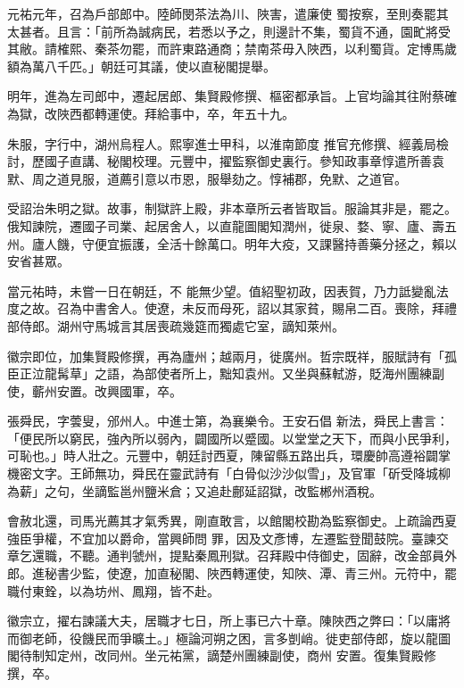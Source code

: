 \begin{pinyinscope}
 元祐元年，召為戶部郎中。陸師閔茶法為川、陜害，遣廉使
 蜀按察，至則奏罷其太甚者。且言：「前所為誠病民，若悉以予之，則邊計不集，蜀貨不通，園甿將受其敝。請榷熙、秦茶勿罷，而許東路通商；禁南茶毋入陜西，以利蜀貨。定博馬歲額為萬八千匹。」朝廷可其議，使以直秘閣提舉。



 明年，進為左司郎中，遷起居郎、集賢殿修撰、樞密都承旨。上官均論其往附蔡確為獄，改陜西都轉運使。拜給事中，卒，年五十九。



 朱服，字行中，湖州烏程人。熙寧進士甲科，以淮南節度
 推官充修撰、經義局檢討，歷國子直講、秘閣校理。元豐中，擢監察御史裏行。參知政事章惇遣所善袁默、周之道見服，道薦引意以市恩，服舉劾之。惇補郡，免默、之道官。



 受詔治朱明之獄。故事，制獄許上殿，非本章所云者皆取旨。服論其非是，罷之。俄知諫院，遷國子司業、起居舍人，以直龍圖閣知潤州，徙泉、婺、寧、廬、壽五州。廬人饑，守便宜振護，全活十餘萬口。明年大疫，又課醫持善藥分拯之，賴以安省甚眾。



 當元祐時，未嘗一日在朝廷，不
 能無少望。值紹聖初政，因表賀，乃力詆變亂法度之故。召為中書舍人。使遼，未反而母死，詔以其家貧，賜帛二百。喪除，拜禮部侍郎。湖州守馬城言其居喪疏幾筵而獨處它室，謫知萊州。



 徽宗即位，加集賢殿修撰，再為廬州；越兩月，徙廣州。哲宗既祥，服賦詩有「孤臣正泣龍髯草」之語，為部使者所上，黜知袁州。又坐與蘇軾游，貶海州團練副使，蘄州安置。改興國軍，卒。



 張舜民，字蕓叟，邠州人。中進士第，為襄樂令。王安石倡
 新法，舜民上書言：「便民所以窮民，強內所以弱內，闢國所以蹙國。以堂堂之天下，而與小民爭利，可恥也。」時人壯之。元豐中，朝廷討西夏，陳留縣五路出兵，環慶帥高遵裕闢掌機密文字。王師無功，舜民在靈武詩有「白骨似沙沙似雪」，及官軍「斫受降城柳為薪」之句，坐謫監邕州鹽米倉；又追赴鄜延詔獄，改監郴州酒稅。



 會赦北還，司馬光薦其才氣秀異，剛直敢言，以館閣校勘為監察御史。上疏論西夏強臣爭權，不宜加以爵命，當興師問
 罪，因及文彥博，左遷監登聞鼓院。臺諫交章乞還職，不聽。通判虢州，提點秦鳳刑獄。召拜殿中侍御史，固辭，改金部員外郎。進秘書少監，使遼，加直秘閣、陜西轉運使，知陜、潭、青三州。元符中，罷職付東銓，以為坊州、鳳翔，皆不赴。



 徽宗立，擢右諫議大夫，居職才七日，所上事已六十章。陳陜西之弊曰：「以庸將而御老師，役饑民而爭曠土。」極論河朔之困，言多剴峭。徙吏部侍郎，旋以龍圖閣待制知定州，改同州。坐元祐黨，謫楚州團練副使，商州
 安置。復集賢殿修撰，卒。




\end{pinyinscope}
